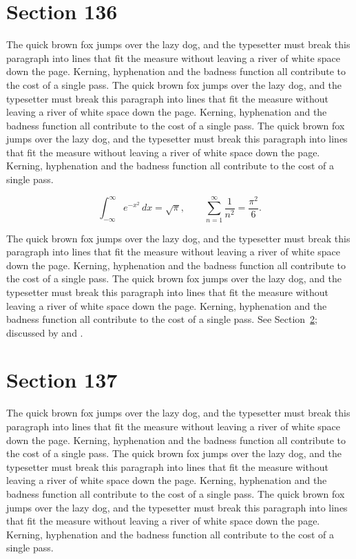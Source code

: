 \documentclass{article}
\begin{document}
\section{Section 136}
\label{sec:136}
The quick brown fox jumps over the lazy dog, and the typesetter must break this paragraph into lines that fit the measure without leaving a river of white space down the page. Kerning, hyphenation and the badness function all contribute to the cost of a single pass. The quick brown fox jumps over the lazy dog, and the typesetter must break this paragraph into lines that fit the measure without leaving a river of white space down the page. Kerning, hyphenation and the badness function all contribute to the cost of a single pass. The quick brown fox jumps over the lazy dog, and the typesetter must break this paragraph into lines that fit the measure without leaving a river of white space down the page. Kerning, hyphenation and the badness function all contribute to the cost of a single pass. 

\begin{equation}\label{eq:136}
\int_{-\infty}^{\infty} e^{-x^{2}}\,dx = \sqrt{\pi}, \qquad
\sum_{n=1}^{\infty} \frac{1}{n^{2}} = \frac{\pi^{2}}{6}.
\end{equation}

The quick brown fox jumps over the lazy dog, and the typesetter must break this paragraph into lines that fit the measure without leaving a river of white space down the page. Kerning, hyphenation and the badness function all contribute to the cost of a single pass. The quick brown fox jumps over the lazy dog, and the typesetter must break this paragraph into lines that fit the measure without leaving a river of white space down the page. Kerning, hyphenation and the badness function all contribute to the cost of a single pass. 
See Section~\ref{sec:137}; discussed by \textcite{k2} and \textcite{l4}.
\section{Section 137}
\label{sec:137}
The quick brown fox jumps over the lazy dog, and the typesetter must break this paragraph into lines that fit the measure without leaving a river of white space down the page. Kerning, hyphenation and the badness function all contribute to the cost of a single pass. The quick brown fox jumps over the lazy dog, and the typesetter must break this paragraph into lines that fit the measure without leaving a river of white space down the page. Kerning, hyphenation and the badness function all contribute to the cost of a single pass. The quick brown fox jumps over the lazy dog, and the typesetter must break this paragraph into lines that fit the measure without leaving a river of white space down the page. Kerning, hyphenation and the badness function all contribute to the cost of a single pass. 
\end{document}

